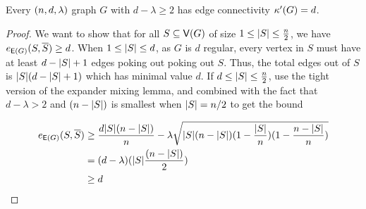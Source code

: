 \documentclass[11pt]{article}
\begin{document}

\begin{lemma}\label{lemma:edge-connectivity-pseudorandom}
Every $\EnDeeLambda$ graph $G$ with $d - \lambda \geq 2$ has edge connectivity $\EdgeConnectivity{G} = d$.
\end{lemma}
\begin{proof}
  We want to show that for all $S \subseteq \Vertices{G}$ of size $1 \leq \Size{S} \leq \frac{n}{2}$, we have $\CutEdges{S}{\Complement{S}}{\Edges{G}} \geq d$.
  When $1\leq \Size{S} \leq d$, as $G$ is $d$ regular, every vertex in $S$ must have at least $d- \Size{S} + 1$ edges poking out poking out $S$.
  Thus, the total edges out of $S$ is $\Size{S}(d- \Size{S} + 1)$ which has minimal value $d$.
  If $d \leq \Size{S} \leq \frac{n}{2}$, use the tight version of the expander mixing lemma, and combined with the  fact that $d- \lambda > 2$ and $(n-\Size{S})$ is smallest when $\Size{S} = n/2$ to get the bound

  \begin{align*}
    \CutEdges{S}{\Complement{S}}{\Edges{G}} &\geq \frac{d\Size{S}(n-\Size{S})}{n} - \lambda\sqrt{\Size{S}(n-\Size{S}) (1 - \frac{\Size{S}}{n}) (1 - \frac{n-\Size{S}}{n})   }\\
                                            &=  (d-\lambda)(\Size{S}\frac{(n-\Size{S})}{2}) \\
                                              &\geq d
    \end{align*}
  
\end{proof}

\end{document}
